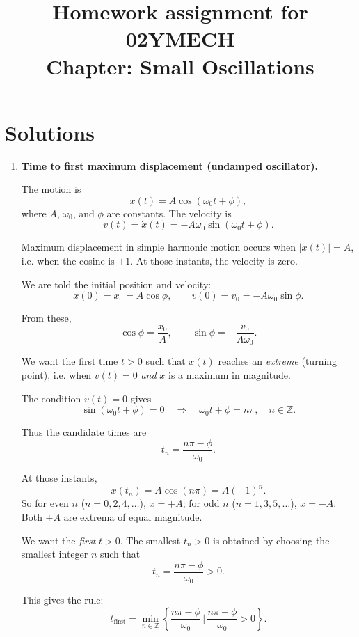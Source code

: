 \documentclass[12pt]{article}
\title{Homework assignment for 02YMECH \\ Chapter: Small Oscillations}
\date{}
\begin{document}
\maketitle

\vspace*{-2cm}

\section*{Solutions}

\begin{enumerate}

\item \textbf{Time to first maximum displacement (undamped oscillator).}

The motion is
\[
x(t) = A \cos(\omega_0 t + \phi),
\]
where $A$, $\omega_0$, and $\phi$ are constants. The velocity is
\[
v(t) = \dot{x}(t) = -A \omega_0 \sin(\omega_0 t + \phi).
\]

Maximum displacement in simple harmonic motion occurs when $|x(t)| = A$, i.e. when the cosine is $\pm 1$. At those instants, the velocity is zero.

We are told the initial position and velocity:
\[
x(0) = x_0 = A \cos \phi,
\qquad
v(0) = v_0 = -A \omega_0 \sin \phi.
\]

From these,
\[
\cos \phi = \frac{x_0}{A},
\qquad
\sin \phi = - \frac{v_0}{A \omega_0}.
\]

We want the first time $t>0$ such that $x(t)$ reaches an \emph{extreme} (turning point), i.e. when $v(t)=0$ \emph{and} $x$ is a maximum in magnitude.

The condition $v(t)=0$ gives
\[
\sin(\omega_0 t + \phi) = 0
\quad \Longrightarrow \quad
\omega_0 t + \phi = n\pi,
\quad n \in \mathbb{Z}.
\]

Thus the candidate times are
\[
t_n = \frac{n\pi - \phi}{\omega_0}.
\]

At those instants,
\[
x(t_n) = A \cos(n\pi) = A(-1)^n.
\]
So for even $n$ ($n=0,2,4,\dots$), $x = +A$; for odd $n$ ($n=1,3,5,\dots$), $x = -A$. Both $\pm A$ are extrema of equal magnitude.

We want the \emph{first} $t>0$. The smallest $t_n>0$ is obtained by choosing the smallest integer $n$ such that
\[
t_n = \frac{n\pi - \phi}{\omega_0} > 0.
\]

This gives the rule:
\[
t_{\text{first}} = \min_{n \in \mathbb{Z}} \left\{ \frac{n\pi - \phi}{\omega_0} \, \Big| \, \frac{n\pi - \phi}{\omega_0} > 0 \right\}.
\]


\end{enumerate}
\end{document}
